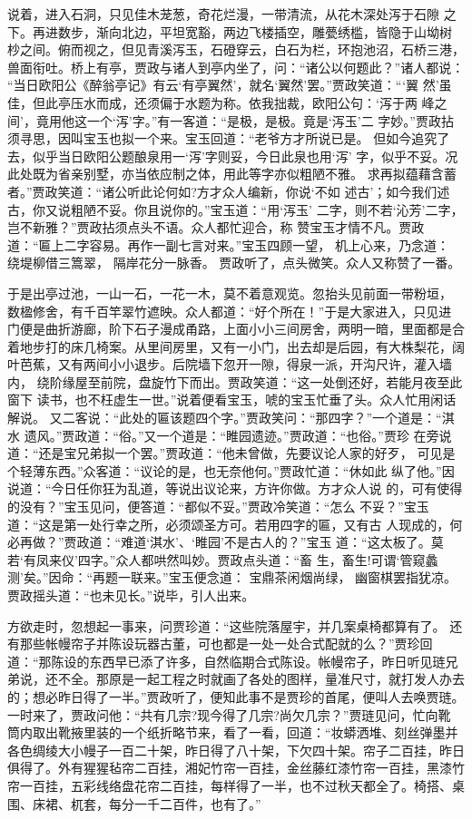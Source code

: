 说着，进入石洞，只见佳木茏葱，奇花烂漫，一带清流，从花木深处泻于石隙
之下。再进数步，渐向北边，平坦宽豁，两边飞楼插空，雕甍绣槛，皆隐于山坳树
杪之间。俯而视之，但见青溪泻玉，石磴穿云，白石为栏，环抱池沼，石桥三港，
兽面衔吐。桥上有亭，贾政与诸人到亭内坐了，问：“诸公以何题此？”诸人都说：
“当日欧阳公《醉翁亭记》有云‘有亭翼然’，就名‘翼然’罢。”贾政笑道：“‘翼
然’虽佳，但此亭压水而成，还须偏于水题为称。依我拙裁，欧阳公句：‘泻于两
峰之间’，竟用他这一个‘泻’字。”有一客道：“是极，是极。竟是‘泻玉’二
字妙。”贾政拈须寻思，因叫宝玉也拟一个来。宝玉回道：“老爷方才所说已是。
但如今追究了去，似乎当日欧阳公题酿泉用一‘泻’字则妥，今日此泉也用‘泻’
字，似乎不妥。况此处既为省亲别墅，亦当依应制之体，用此等字亦似粗陋不雅。
求再拟蕴藉含蓄者。”贾政笑道：“诸公听此论何如?方才众人编新，你说‘不如
述古’；如今我们述古，你又说粗陋不妥。你且说你的。”宝玉道：“用‘泻玉’
二字，则不若‘沁芳’二字，岂不新雅？”贾政拈须点头不语。众人都忙迎合，称
赞宝玉才情不凡。贾政道：“匾上二字容易。再作一副七言对来。”宝玉四顾一望，
机上心来，乃念道：
绕堤柳借三篙翠，
隔岸花分一脉香。
贾政听了，点头微笑。众人又称赞了一番。

于是出亭过池，一山一石，一花一木，莫不着意观览。忽抬头见前面一带粉垣，
数楹修舍，有千百竿翠竹遮映。众人都道：“好个所在！”于是大家进入，只见进
门便是曲折游廊，阶下石子漫成甬路，上面小小三间房舍，两明一暗，里面都是合
着地步打的床几椅案。从里间房里，又有一小门，出去却是后园，有大株梨花，阔
叶芭蕉，又有两间小小退步。后院墙下忽开一隙，得泉一派，开沟尺许，灌入墙内，
绕阶缘屋至前院，盘旋竹下而出。贾政笑道：“这一处倒还好，若能月夜至此窗下
读书，也不枉虚生一世。”说着便看宝玉，唬的宝玉忙垂了头。众人忙用闲话解说。
又二客说：“此处的匾该题四个字。”贾政笑问：“那四字？”一个道是：“淇水
遗风。”贾政道：“俗。”又一个道是：“睢园遗迹。”贾政道：“也俗。”贾珍
在旁说道：“还是宝兄弟拟一个罢。”贾政道：“他未曾做，先要议论人家的好歹，
可见是个轻薄东西。”众客道：“议论的是，也无奈他何。”贾政忙道：“休如此
纵了他。”因说道：“今日任你狂为乱道，等说出议论来，方许你做。方才众人说
的，可有使得的没有？”宝玉见问，便答道：“都似不妥。”贾政冷笑道：“怎么
不妥？”宝玉道：“这是第一处行幸之所，必须颂圣方可。若用四字的匾，又有古
人现成的，何必再做？”贾政道：“难道‘淇水’、‘睢园’不是古人的？”宝玉
道：“这太板了。莫若‘有凤来仪’四字。”众人都哄然叫妙。贾政点头道：“畜
生，畜生!可谓‘管窥蠡测’矣。”因命：“再题一联来。”宝玉便念道：
宝鼎茶闲烟尚绿，
幽窗棋罢指犹凉。
贾政摇头道：“也未见长。”说毕，引人出来。

方欲走时，忽想起一事来，问贾珍道：“这些院落屋宇，并几案桌椅都算有了。
还有那些帐幔帘子并陈设玩器古董，可也都是一处一处合式配就的么？”贾珍回
道：“那陈设的东西早已添了许多，自然临期合式陈设。帐幔帘子，昨日听见琏兄
弟说，还不全。那原是一起工程之时就画了各处的图样，量准尺寸，就打发人办去
的；想必昨日得了一半。”贾政听了，便知此事不是贾珍的首尾，便叫人去唤贾琏。
一时来了，贾政问他：“共有几宗?现今得了几宗?尚欠几宗？”贾琏见问，忙向靴
筒内取出靴掖里装的一个纸折略节来，看了一看，回道：“妆蟒洒堆、刻丝弹墨并
各色绸绫大小幔子一百二十架，昨日得了八十架，下欠四十架。帘子二百挂，昨日
俱得了。外有猩猩毡帘二百挂，湘妃竹帘一百挂，金丝藤红漆竹帘一百挂，黑漆竹
帘一百挂，五彩线络盘花帘二百挂，每样得了一半，也不过秋天都全了。椅搭、桌
围、床裙、杌套，每分一千二百件，也有了。”

